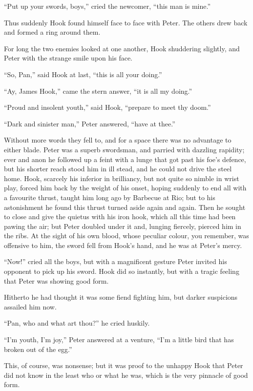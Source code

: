 ``Put up your swords, boys,'' cried the newcomer, ``this man is mine.''

Thus suddenly Hook found himself face to face with Peter. The others
drew back and formed a ring around them.

For long the two enemies looked at one another, Hook shuddering
slightly, and Peter with the strange smile upon his face.

``So, Pan,'' said Hook at last, ``this is all your doing.''

``Ay, James Hook,'' came the stern answer, ``it is all my doing.''

``Proud and insolent youth,'' said Hook, ``prepare to meet thy doom.''

``Dark and sinister man,'' Peter answered, ``have at thee.''

Without more words they fell to, and for a space there was no advantage
to either blade. Peter was a superb swordsman, and parried with
dazzling rapidity; ever and anon he followed up a feint with a lunge
that got past his foe's defence, but his shorter reach stood him in ill
stead, and he could not drive the steel home. Hook, scarcely his
inferior in brilliancy, but not quite so nimble in wrist play, forced
him back by the weight of his onset, hoping suddenly to end all with a
favourite thrust, taught him long ago by Barbecue at Rio; but to his
astonishment he found this thrust turned aside again and again. Then he
sought to close and give the quietus with his iron hook, which all this
time had been pawing the air; but Peter doubled under it and, lunging
fiercely, pierced him in the ribs. At the sight of his own blood, whose
peculiar colour, you remember, was offensive to him, the sword fell
from Hook's hand, and he was at Peter's mercy.

``Now!'' cried all the boys, but with a magnificent gesture Peter invited
his opponent to pick up his sword. Hook did so instantly, but with a
tragic feeling that Peter was showing good form.

Hitherto he had thought it was some fiend fighting him, but darker
suspicions assailed him now.

``Pan, who and what art thou?'' he cried huskily.

``I'm youth, I'm joy,'' Peter answered at a venture, ``I'm a little bird
that has broken out of the egg.''

This, of course, was nonsense; but it was proof to the unhappy Hook
that Peter did not know in the least who or what he was, which is the
very pinnacle of good form.

